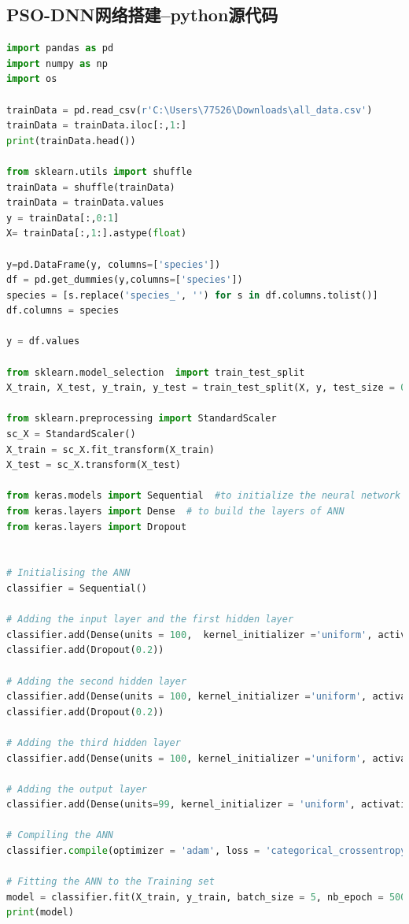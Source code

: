 \documentclass{whutmod}
\begin{document}
\subsection{PSO-DNN网络搭建--python源代码}
\begin{lstlisting}[language=python]
import pandas as pd
import numpy as np
import os

trainData = pd.read_csv(r'C:\Users\77526\Downloads\all_data.csv')
trainData = trainData.iloc[:,1:]
print(trainData.head())

from sklearn.utils import shuffle
trainData = shuffle(trainData)
trainData = trainData.values
y = trainData[:,0:1]
X= trainData[:,1:].astype(float)

y=pd.DataFrame(y, columns=['species'])
df = pd.get_dummies(y,columns=['species'])
species = [s.replace('species_', '') for s in df.columns.tolist()]
df.columns = species

y = df.values

from sklearn.model_selection  import train_test_split
X_train, X_test, y_train, y_test = train_test_split(X, y, test_size = 0.2, random_state = 42)

from sklearn.preprocessing import StandardScaler
sc_X = StandardScaler()
X_train = sc_X.fit_transform(X_train)
X_test = sc_X.transform(X_test)

from keras.models import Sequential  #to initialize the neural network
from keras.layers import Dense  # to build the layers of ANN
from keras.layers import Dropout


# Initialising the ANN
classifier = Sequential()

# Adding the input layer and the first hidden layer
classifier.add(Dense(units = 100,  kernel_initializer ='uniform', activation = 'relu', input_dim = 192))
classifier.add(Dropout(0.2))

# Adding the second hidden layer
classifier.add(Dense(units = 100, kernel_initializer ='uniform', activation = 'relu'))
classifier.add(Dropout(0.2))

# Adding the third hidden layer
classifier.add(Dense(units = 100, kernel_initializer ='uniform', activation = 'relu'))

# Adding the output layer
classifier.add(Dense(units=99, kernel_initializer = 'uniform', activation = 'softmax'))

# Compiling the ANN
classifier.compile(optimizer = 'adam', loss = 'categorical_crossentropy', metrics = ['accuracy'])

# Fitting the ANN to the Training set
model = classifier.fit(X_train, y_train, batch_size = 5, nb_epoch = 500)
print(model)



\end{lstlisting}
\end{document}
